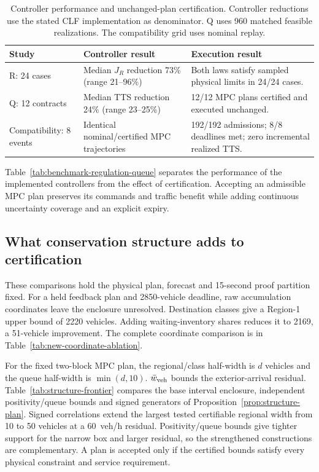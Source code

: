 \documentclass[preprint,12pt]{elsarticle}
\begin{document}
\begin{table}[t]
\centering\small
\caption{Controller performance and unchanged-plan certification. Controller
reductions use the stated CLF implementation as denominator. Q uses 960
matched feasible realizations. The compatibility grid uses nominal replay.}
\label{tab:benchmark-regulation-queue}
\label{tab:eight-event-compatibility-summary}
\begin{tabular}{@{}p{}p{}p{}@{}}
\toprule
Study & Controller result & Execution result\\
\midrule
R: 24 cases & Median $J_R$ reduction 73\% (range 21--96\%) & Both laws satisfy sampled physical limits in 24/24 cases.\\
Q: 12 contracts & Median TTS reduction 24\% (range 23--25\%) & 12/12 MPC plans certified and executed unchanged.\\
Compatibility: 8 events & Identical nominal/certified MPC trajectories & 192/192 admissions; 8/8 deadlines met; zero incremental realized TTS.\\
\bottomrule
\end{tabular}
\end{table}

Table~\ref{tab:benchmark-regulation-queue} separates the performance of the
implemented controllers from the effect of certification. Accepting an
admissible MPC plan preserves its commands and traffic benefit while adding
continuous uncertainty coverage and an explicit expiry.

\subsection{What conservation structure adds to certification}
\label{sec:structure-results}
\label{sec:new-mpc-results}
\label{sec:structure-online}
\label{sec:network-transfer-results}

These comparisons hold the physical plan, forecast and 15-second proof
partition fixed. For a held feedback plan and 2850-vehicle deadline, raw
accumulation coordinates leave the enclosure unresolved. Destination classes
give a Region-1 upper bound of 2220 vehicles. Adding waiting-inventory shares
reduces it to 2169, a 51-vehicle improvement. The complete coordinate
comparison is in Table~\ref{tab:new-coordinate-ablation}.

For the fixed two-block MPC plan, the regional/class half-width is $d$
vehicles and the queue half-width is $\min(d,10)$. $\bar w_{\rm veh}$ bounds the
exterior-arrival residual. Table~\ref{tab:structure-frontier} compares the
base interval enclosure, independent positivity/queue bounds and signed generators
of Proposition~\ref{prop:structure-plan}. Signed correlations extend the
largest tested certifiable regional width from 10 to 50 vehicles at a
60~veh/h residual. Positivity/queue bounds give tighter support for the
narrow box and larger residual, so the strengthened constructions are
complementary. A plan is accepted only if the certified bounds satisfy every physical
constraint and service requirement.
\end{document}
